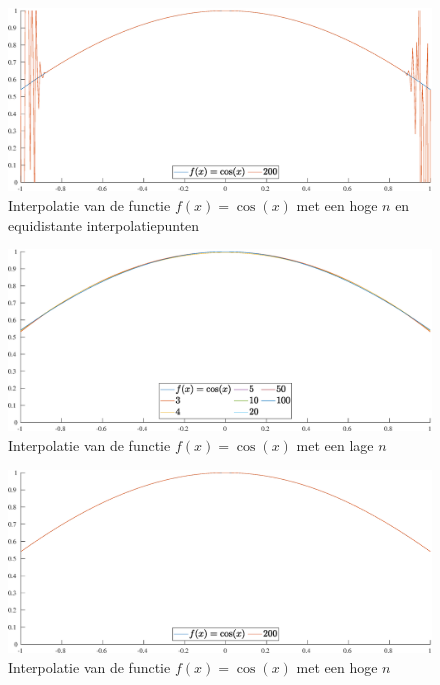\documentclass[a4paper, 12pt, titlepage, fleqn]{article}
\begin{document}
\begin{figure}
\centering
\includegraphics[scale=0.4]{../Afbeeldingen/cos_equi_hoog.eps}
\caption{Interpolatie van de functie $f(x) = \cos(x)$ met een hoge $n$ en equidistante interpolatiepunten}
\label{fig:hogeNCosEqui}
\end{figure}

\begin{figure}
\centering
\includegraphics[scale=0.4]{../Afbeeldingen/cos_nul_laag.eps}
\caption{Interpolatie van de functie $f(x) = \cos(x)$ met een lage $n$}
\label{fig:lageNCosNul}
\end{figure}

\begin{figure}
\centering
\includegraphics[scale=0.4]{../Afbeeldingen/cos_nul_hoog.eps}
\caption{Interpolatie van de functie $f(x) = \cos(x)$ met een hoge $n$}
\label{fig:hogeNCosNul}
\end{figure}
\end{document}
